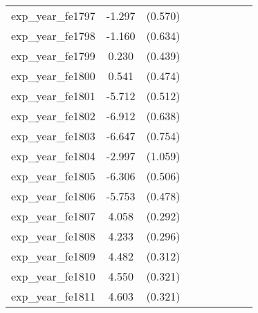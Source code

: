 {\begin{tabular}{l*{4}{cc}}
exp\_year\_fe1797&   -1.297\sym{*}  &  (0.570)&                  &         &                  &         &                  &         \\
exp\_year\_fe1798&   -1.160         &  (0.634)&                  &         &                  &         &                  &         \\
exp\_year\_fe1799&    0.230         &  (0.439)&                  &         &                  &         &                  &         \\
exp\_year\_fe1800&    0.541         &  (0.474)&                  &         &                  &         &                  &         \\
exp\_year\_fe1801&   -5.712\sym{***}&  (0.512)&                  &         &                  &         &                  &         \\
exp\_year\_fe1802&   -6.912\sym{***}&  (0.638)&                  &         &                  &         &                  &         \\
exp\_year\_fe1803&   -6.647\sym{***}&  (0.754)&                  &         &                  &         &                  &         \\
exp\_year\_fe1804&   -2.997\sym{**} &  (1.059)&                  &         &                  &         &                  &         \\
exp\_year\_fe1805&   -6.306\sym{***}&  (0.506)&                  &         &                  &         &                  &         \\
exp\_year\_fe1806&   -5.753\sym{***}&  (0.478)&                  &         &                  &         &                  &         \\
exp\_year\_fe1807&    4.058\sym{***}&  (0.292)&                  &         &                  &         &                  &         \\
exp\_year\_fe1808&    4.233\sym{***}&  (0.296)&                  &         &                  &         &                  &         \\
exp\_year\_fe1809&    4.482\sym{***}&  (0.312)&                  &         &                  &         &                  &         \\
exp\_year\_fe1810&    4.550\sym{***}&  (0.321)&                  &         &                  &         &                  &         \\
exp\_year\_fe1811&    4.603\sym{***}&  (0.321)&                  &         &                  &         &                  &         \\

\end{tabular}}
